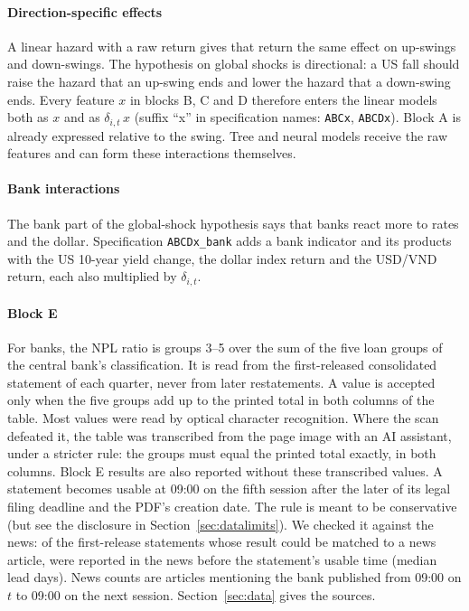 \paragraph{Direction-specific effects} A linear hazard with a raw return gives that return the same
effect on up-swings and down-swings. The hypothesis on global shocks is directional: a US
fall should raise the hazard that an up-swing ends and lower the hazard that a down-swing ends.
Every feature $x$ in blocks B, C and D therefore enters the linear models both as $x$ and as
$\delta_{i,t}\,x$ (suffix ``x'' in specification names: \texttt{ABCx}, \texttt{ABCDx}). Block A is
already expressed relative to the swing. Tree and neural models receive the raw features and
can form these interactions themselves.

\paragraph{Bank interactions} The bank part of the global-shock hypothesis says that banks react more
to rates and the dollar. Specification \texttt{ABCDx\_bank} adds a bank indicator and its products
with the US 10-year yield change, the dollar index return and the USD/VND return, each also
multiplied by $\delta_{i,t}$.

\paragraph{Block E} For banks, the NPL ratio is groups 3--5 over the sum of the five loan groups of
the central bank's classification. It is read from the first-released consolidated statement of
each quarter, never from later restatements. A value is accepted only when the five groups add up to
the printed total in both columns of the table. Most values were read by optical character
recognition. Where the scan defeated it, the table was transcribed from the page image with an AI
assistant, under a stricter rule: the groups must equal the printed total exactly, in both columns.
Block E results are also reported without these transcribed values. A statement becomes usable at
09:00 on the fifth session after the later of its legal filing deadline and the PDF's creation
date. The rule is meant to be conservative (but see the disclosure in Section~\ref{sec:datalimits}). We checked it against the news: of the \BlockENewsMatched{} first-release statements whose result
could be matched to a news article, \BlockENewsLead{} were reported in the news before the statement's
usable time (median lead \BlockENewsLeadDays{} days). News counts are articles mentioning the bank published from 09:00 on $t$
to 09:00 on the next session. Section~\ref{sec:data} gives the sources.

